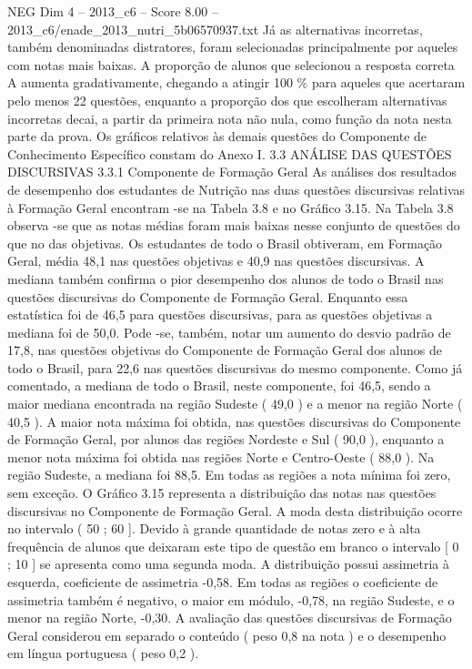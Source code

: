 \begin{textsample}{NEG Dim 4 – 2013\_c6 – Score 8.00 – 2013\_c6/enade\_2013\_nutri\_5b06570937.txt}
Já as alternativas incorretas, também denominadas distratores, foram selecionadas principalmente por aqueles com notas mais baixas.
A proporção de alunos que selecionou a resposta correta A aumenta gradativamente, chegando a atingir 100 \% para aqueles que acertaram pelo menos 22 questões, enquanto a proporção dos que escolheram alternativas incorretas decai, a partir da primeira nota não nula, como função da nota nesta parte da prova.
Os gráficos relativos às demais questões do Componente de Conhecimento Específico constam do Anexo I. 3.3 ANÁLISE DAS QUESTÕES DISCURSIVAS 3.3.1 Componente de Formação Geral As análises dos resultados de desempenho dos estudantes de Nutrição nas duas questões discursivas relativas à Formação Geral encontram -se na Tabela 3.8 e no Gráfico 3.15.
Na Tabela 3.8 observa -se que as notas médias foram mais baixas nesse conjunto de questões do que no das objetivas.
Os estudantes de todo o Brasil obtiveram, em Formação Geral, média 48,1 nas questões objetivas e 40,9 nas questões discursivas.
A mediana também confirma o pior desempenho dos alunos de todo o Brasil nas questões discursivas do Componente de Formação Geral.
Enquanto essa estatística foi de 46,5 para questões discursivas, para as questões objetivas a mediana foi de 50,0.
Pode -se, também, notar um aumento do desvio padrão de 17,8, nas questões objetivas do Componente de Formação Geral dos alunos de todo o Brasil, para 22,6 nas questões discursivas do mesmo componente.
Como já comentado, a mediana de todo o Brasil, neste componente, foi 46,5, sendo a maior mediana encontrada na região Sudeste ( 49,0 ) e a menor na região Norte ( 40,5 ).
A maior nota máxima foi obtida, nas questões discursivas do Componente de Formação Geral, por alunos das regiões Nordeste e Sul ( 90,0 ), enquanto a menor nota máxima foi obtida nas regiões Norte e Centro-Oeste ( 88,0 ).
Na região Sudeste, a mediana foi 88,5.
Em todas as regiões a nota mínima foi zero, sem exceção.
O Gráfico 3.15 representa a distribuição das notas nas questões discursivas no Componente de Formação Geral.
A moda desta distribuição ocorre no intervalo ( 50 ; 60 ].
Devido à grande quantidade de notas zero e à alta frequência de alunos que deixaram este tipo de questão em branco o intervalo [ 0 ; 10 ] se apresenta como uma segunda moda.
A distribuição possui assimetria à esquerda, coeficiente de assimetria -0,58.
Em todas as regiões o coeficiente de assimetria também é negativo, o maior em módulo, -0,78, na região Sudeste, e o menor na região Norte, -0,30.
A avaliação das questões discursivas de Formação Geral considerou em separado o conteúdo ( peso 0,8 na nota ) e o desempenho em língua portuguesa ( peso 0,2 ).

\end{textsample}
